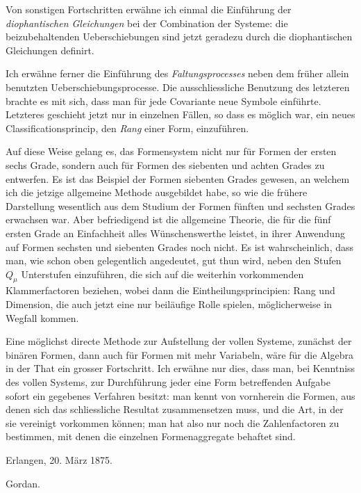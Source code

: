 \documentclass[10pt]{article}
\begin{document}
Von sonstigen Fortschritten erwähne ich einmal die Einführung der \textit{diophantischen Gleichungen} bei der Combination der Systeme: die beizubehaltenden Ueberschiebungen sind jetzt geradezu durch die diophantischen Gleichungen definirt.

Ich erwähne ferner die Einführung des \textit{Faltungsprocesses} neben dem früher allein benutzten Ueberschiebungsprocesse. Die ausschliessliche Benutzung des letzteren brachte es mit sich, dass man für jede Covariante neue Symbole einführte. Letzteres geschieht jetzt nur in einzelnen Fällen, so dass es möglich war, ein neues Classificationsprincip, den \textit{Rang} einer Form, einzuführen.

Auf diese Weise gelang es, das Formensystem nicht nur für Formen der ersten sechs Grade, sondern auch für Formen des siebenten und achten Grades zu entwerfen. Es ist das Beispiel der Formen siebenten Grades gewesen, an welchem ich die jetzige allgemeine Methode ausgebildet habe, so wie die frühere Darstellung wesentlich aus dem Studium der Formen fünften und sechsten Grades erwachsen war. Aber befriedigend ist die allgemeine Theorie, die für die fünf ersten Grade an Einfachheit alles Wünschenswerthe leistet, in ihrer Anwendung auf Formen sechsten und siebenten Grades noch nicht. Es ist wahrscheinlich, dass man, wie schon oben gelegentlich angedeutet, gut thun wird, neben den Stufen $Q_\mu$ Unterstufen einzuführen, die sich auf die weiterhin vorkommenden Klammerfactoren beziehen, wobei dann die Eintheilungsprincipien: Rang und Dimension, die auch jetzt eine nur beiläufige Rolle spielen, möglicherweise in Wegfall kommen.

Eine möglichst directe Methode zur Aufstellung der vollen Systeme, zunächst der binären Formen, dann auch für Formen mit mehr Variabeln, wäre für die Algebra in der That ein grosser Fortschritt. Ich erwähne nur dies, dass man, bei Kenntniss des vollen Systems, zur Durchführung jeder eine Form betreffenden Aufgabe sofort ein gegebenes Verfahren besitzt: man kennt von vornherein die Formen, aus denen sich das schliessliche Resultat zusammensetzen muss, und die Art, in der sie vereinigt vorkommen können; man hat also nur noch die Zahlenfactoren zu bestimmen, mit denen die einzelnen Formenaggregate behaftet sind.

\begin{flushleft}
Erlangen, 20. März 1875.
\end{flushleft}
\begin{flushright}
Gordan.
\end{flushright}
\end{document}
